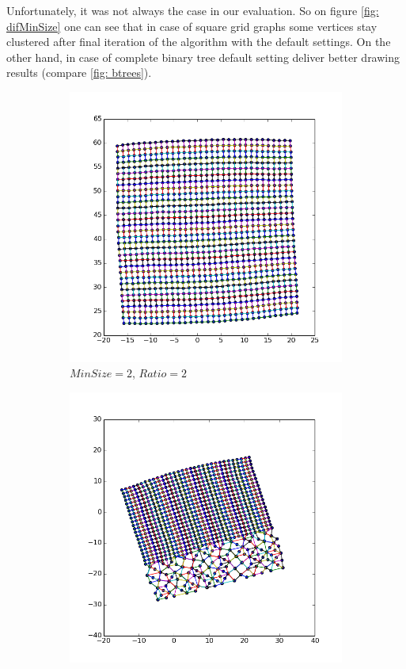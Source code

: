 \documentclass[12pt,a4paper]{article}
\begin{document}
Unfortunately, it was not always the case in our evaluation. So on figure \ref{fig: difMinSize} one can see that in case of square grid graphs some vertices stay clustered after final iteration of the algorithm with the default settings. On the other hand, in case of complete binary tree default setting deliver better drawing results (compare \ref{fig: btrees}).

\begin{figure}[htb]
	 \begin{subfigure}{0.5\textwidth}
		   \centering
           \includegraphics[scale=0.45]{results_Harel/HK_grid32x32_m2r2.png}
           \caption{$MinSize=2$, $Ratio=2$}
     \end{subfigure}
	 \begin{subfigure}{0.5\textwidth}
			\centering
           \includegraphics[scale=0.45]{results_Harel/HK_grid32x32_m10_r3.png}

\end{subfigure}
\end{figure}
\end{document}
